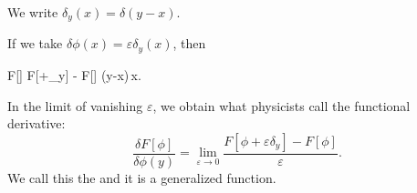We write $\delta_{y}(x)=\delta(y-x)$.

If we take $\delta\phi(x)=\varepsilon\delta_{y}(x)$, then
\begin{calculation}
\delta F[\phi]
F[\phi+\varepsilon\delta_{y}] - F[\phi]
\int{}\varepsilon\delta(y-x)\,\D x.
\end{calculation}
In the limit of vanishing $\varepsilon$, we obtain what physicists call
the functional derivative:
\begin{equation}
\boxed{\frac{\delta F[\phi]}{\delta\phi(y)}=\lim_{\varepsilon\to0}\frac{F[\phi+\varepsilon\delta_{y}]-F[\phi]}{\varepsilon}.}
\end{equation}
We call this the  and it is a
generalized function.


